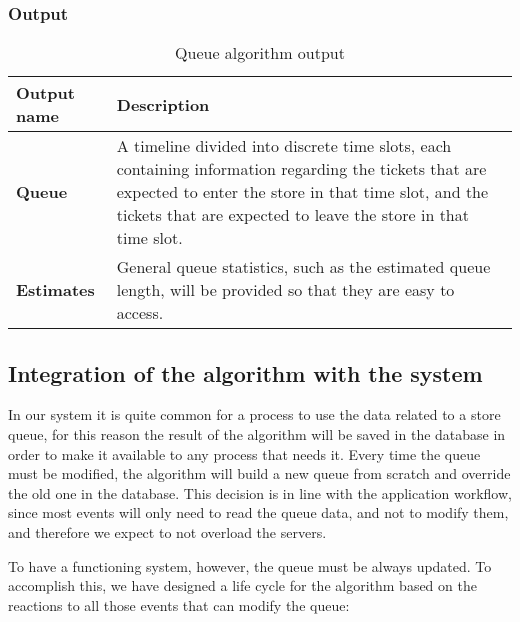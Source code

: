 
\subsubsection{Output}
\label{subsubsect:Output}

\begin{table}[h!]
    \centering
    \begin{tabular}{@{}P{0.13\textwidth}P{0.85\textwidth}@{}}
        \toprule
        \textbf{Output name}& \textbf{Description}\\
        \midrule
        \textbf{Queue}                & A timeline divided into discrete time slots, each containing information regarding the tickets that are expected to enter the store in that time slot, and the tickets that are expected to leave the store in that time slot.\\
        \textbf{Estimates}            & General queue statistics, such as the estimated queue length, will be provided so that they are easy to access.\\
        \bottomrule
    \end{tabular}
\caption{Queue algorithm output}
\label{table:output}
\end{table}

\subsection{Integration of the algorithm with the system}
\label{subsubsect:integrationofthealgorithmintothesystem}

In our system it is quite common for a process to use the data related to a store queue, for this reason the result of the algorithm will be saved in the database in order to make it available to any process that needs it. Every time the queue must be modified, the algorithm will build a new queue from scratch and override the old one in the database. This decision is in line with the application workflow, since most events will only need to read the queue data, and not to modify them, and therefore we expect to not overload the servers.

To have a functioning system, however, the queue must be always updated. To accomplish this, we have designed a life cycle for the algorithm based on the reactions to all those events that can modify the queue:


